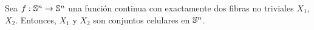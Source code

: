 


\begin{lema}\label{2ctos}
    Sea $f:\mathbb{S}^n\to\mathbb{S}^n$ una función continua con exactamente dos fibras no triviales $X_1$, $X_2$. Entonces, $X_1$ y $X_2$ son conjuntos celulares en $\mathbb{S}^n$.
\end{lema}

